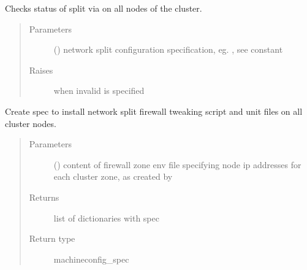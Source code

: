 \documentclass[letterpaper,10pt,english]{sphinxmanual}
\begin{document}
\begin{fulllineitems}
\label{\detokenize{ocpnetsplit:ocpnetsplit.main.check_split}}
Checks status of split via  on all nodes of the
cluster.
\begin{quote}\begin{description}
\item[{Parameters}] \leavevmode
{} () \textendash{} network split configuration specification, eg.
, see {\hyperref[\detokenize{ocpnetsplit:ocpnetsplit.zone.NETWORK_SPLITS}]{}}
constant

\item[{Raises}] \leavevmode
{} \textendash{} when invalid  is specified

\end{description}\end{quote}

\end{fulllineitems}


\begin{fulllineitems}
\label{\detokenize{ocpnetsplit:ocpnetsplit.main.get_networksplit_mc_spec}}
Create  spec to install network split firewall tweaking
script and unit files on all cluster nodes.
\begin{quote}\begin{description}
\item[{Parameters}] \leavevmode
{} () \textendash{} content of firewall zone env file specifying node ip
addresses for each cluster zone, as created by
{\hyperref[\detokenize{ocpnetsplit:ocpnetsplit.zone.ZoneConfig.get_env_file}]{}}

\item[{Returns}] \leavevmode
list of dictionaries with  spec

\item[{Return type}] \leavevmode
machineconfig\_spec

\end{description}\end{quote}

\end{fulllineitems}
\end{document}
